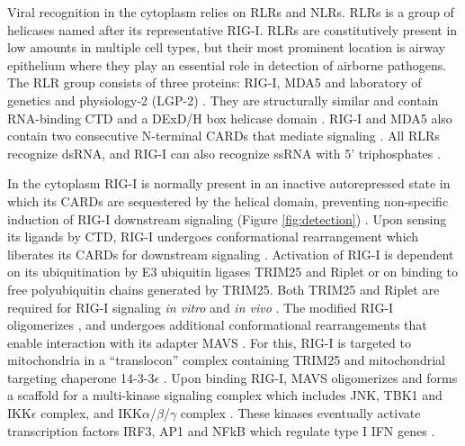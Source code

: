 		Viral recognition in the cytoplasm relies on \glspl{RLR} and \glspl{NLR}. \glspl{RLR} is a group of helicases named after its representative \gls{RIG-I}. \glspl{RLR} are constitutively present in low amounts in multiple cell types, but their most prominent location is airway epithelium \parencite{Bogefors2011} where they play an essential role in detection of airborne pathogens. The \gls{RLR} group consists of three proteins: \gls{RIG-I}, \gls{MDA5} and laboratory of genetics and physiology-2 (LGP-2) \parencite{Kang2004, Yoneyama2004, Yoneyama2005}. They are structurally similar and contain RNA-binding \gls{CTD} and a DExD/H box helicase domain \parencite{Cui2008, Takahasi2009}. \gls{RIG-I} and \gls{MDA5} also contain two consecutive N-terminal \glspl{CARD} that mediate signaling \parencite{Yoneyama2004, Kang2004}. All \glspl{RLR} recognize dsRNA, and \gls{RIG-I} can also recognize ssRNA with 5' triphosphates \parencite{Cui2008}. 
		
		In the cytoplasm \gls{RIG-I} is normally present in an inactive autorepressed state in which its \glspl{CARD} are sequestered by the helical domain, preventing non-specific induction of \gls{RIG-I} downstream signaling (Figure  \ref{fig:detection}) \parencite{Kowalinski2011}. Upon sensing its ligands by \gls{CTD}, \gls{RIG-I} undergoes conformational rearrangement which liberates its \glspl{CARD} for downstream signaling \parencite{Kowalinski2011}. Activation of \gls{RIG-I} is  dependent on its ubiquitination by E3 ubiquitin ligases TRIM25 and Riplet or on binding to free polyubiquitin chains generated by TRIM25. Both TRIM25 and Riplet are required for \gls{RIG-I} signaling \textit{in vitro} and \textit{in vivo} \parencite{Gack2007, Oshiumi2010, Zeng2010}. The modified \gls{RIG-I} oligomerizes \parencite{Patel2013}, and undergoes additional conformational rearrangements that enable interaction with its adapter \gls{MAVS} \parencite{Kawai2005, Seth2005}. For this, \gls{RIG-I} is targeted to mitochondria in a ``translocon'' complex containing TRIM25 and mitochondrial targeting chaperone 14-3-3$\epsilon$ \parencite{Liu2012}. Upon binding \gls{RIG-I}, \gls{MAVS} oligomerizes and forms a scaffold for a multi-kinase signaling complex which includes \gls{JNK}, \gls{TBK1} and \gls{IKK}$\epsilon$ complex, and \gls{IKK}$\alpha$/$\beta$/$\gamma$ complex \parencite{McWhirter2005}. These kinases eventually activate transcription factors \gls{IRF}3, \gls{AP1} and \gls{NFkB} which regulate type I \gls{IFN} genes \parencite{McWhirter2005}. 
		
